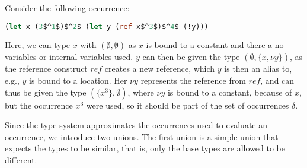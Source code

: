 \documentclass[acmsmall,sigplan]{acmart}
\begin{document}
\begin{example}[]
Consider the following occurrence:
\begin{lstlisting}[language=Caml, mathescape=true]
(let x (3$^1$)$^2$ (let y (ref x$^3$)$^4$ (!y)))
\end{lstlisting}
Here, we can type $x$ with $(\emptyset,\emptyset)$ as $x$ is bound to a constant and there a no variables or internal variables used.
$y$ can then be given the type $(\emptyset,\{x,\nu y\})$, as the reference construct $ref$ creates a new reference, which $y$ is then an alias to, e.g., $y$ is bound to a location.
Her $\nu y$ represents the reference from $ref$, and can thus be given the type $(\{x^3\},\emptyset)$, where $\nu y$ is bound to a constant, because of $x$, but the occurrence $x^3$ were used, so it should be part of the set of occurrences $\delta$.
\end{example}

Since the type system approximates the occurrences used to evaluate an occurrence, we introduce two unions.
The first union is a simple union that expects the types to be similar, that is, only the base types are allowed to be different.
\end{document}
